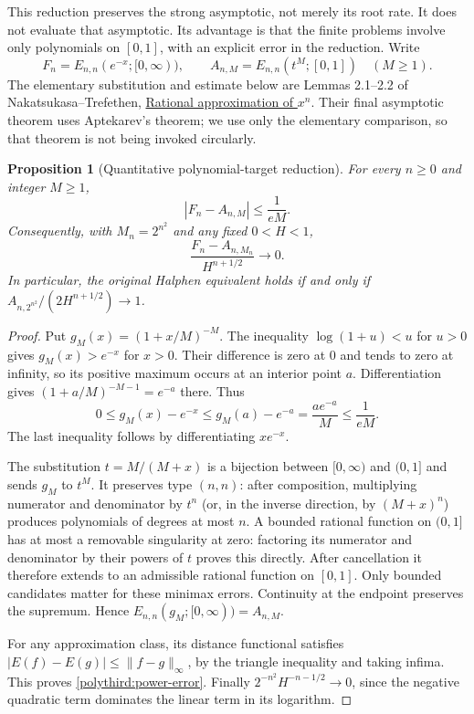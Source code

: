 \documentclass[11pt]{article}
\newtheorem{proposition}[theorem]{Proposition}
\theoremstyle{remark}
\numberwithin{equation}{section}
\begin{document}
This reduction preserves the strong asymptotic, not merely its root rate.
It does not evaluate that asymptotic.  Its advantage is that the finite
problems involve only polynomials on $[0,1]$, with an explicit error in
the reduction.  Write
\[
 F_n=E_{n,n}(e^{-x};[0,\infty)),\qquad
 A_{n,M}=E_{n,n}(t^M;[0,1])\quad(M\ge1).
\]
The elementary substitution and estimate below are Lemmas 2.1--2.2 of
Nakatsukasa--Trefethen,
\href{https://people.maths.ox.ac.uk/trefethen/ratxn.pdf}{Rational approximation of $x^n$}.
Their final asymptotic theorem uses Aptekarev's theorem; we use only the
elementary comparison, so that theorem is not being invoked circularly.

\begin{proposition}[Quantitative polynomial-target reduction]
\label{polythird:power-reduction}
For every $n\ge0$ and integer $M\ge1$,
\begin{equation}\label{polythird:power-error}
 |F_n-A_{n,M}|\le\frac1{eM}.
\end{equation}
Consequently, with $M_n=2^{n^2}$ and any fixed $0<H<1$,
\[
 \frac{F_n-A_{n,M_n}}{H^{n+1/2}}\longrightarrow0.
\]
In particular, the original Halphen equivalent holds if and only if
$A_{n,2^{n^2}}/(2H^{n+1/2})\to1$.
\end{proposition}
\begin{proof}
Put $g_M(x)=(1+x/M)^{-M}$.  The inequality
$\log(1+u)<u$ for $u>0$ gives $g_M(x)>e^{-x}$ for $x>0$.
Their difference is zero at $0$ and tends to zero at infinity, so its
positive maximum occurs at an interior point $a$.  Differentiation gives
$(1+a/M)^{-M-1}=e^{-a}$ there.  Thus
\[
 0\le g_M(x)-e^{-x}\le g_M(a)-e^{-a}
   =\frac{ae^{-a}}M\le\frac1{eM}.
\]
The last inequality follows by differentiating $xe^{-x}$.

The substitution $t=M/(M+x)$ is a bijection between $[0,\infty)$
and $(0,1]$ and sends $g_M$ to $t^M$.  It preserves type $(n,n)$:
after composition, multiplying numerator and denominator by $t^n$
(or, in the inverse direction, by $(M+x)^n$) produces polynomials
of degrees at most $n$.  A bounded rational function on $(0,1]$
has at most a removable singularity at zero: factoring its numerator
and denominator by their powers of $t$ proves this directly.  After
cancellation it therefore extends to an admissible rational function
on $[0,1]$.  Only bounded candidates matter for these minimax errors.
Continuity at the endpoint preserves the supremum.  Hence
$E_{n,n}(g_M;[0,\infty))=A_{n,M}$.

For any approximation class, its distance functional satisfies
$|E(f)-E(g)|\le\|f-g\|_\infty$, by the triangle inequality and
taking infima.  This proves \eqref{polythird:power-error}.
Finally $2^{-n^2}H^{-n-1/2}\to0$, since the negative quadratic term
dominates the linear term in its logarithm.
\end{proof}
\end{document}
